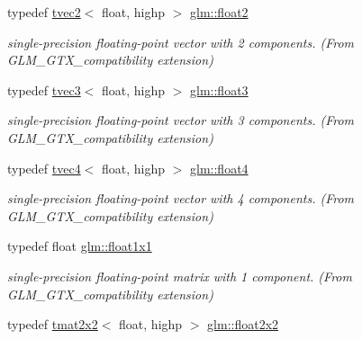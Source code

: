 \begin{DoxyCompactItemize}
typedef \hyperlink{structglm_1_1tvec2}{tvec2}$<$ float, highp $>$ \hyperlink{group__gtx__compatibility_ga3174e387d3b89c5dcff485c4e665a68c}{glm\+::float2}
\begin{DoxyCompactList}\small\item\em single-\/precision floating-\/point vector with 2 components. (From G\+L\+M\+\_\+\+G\+T\+X\+\_\+compatibility extension) \end{DoxyCompactList}\item 
\mbox{\label{group__gtx__compatibility_ga25f20d2c12f9b5f3917467e92899ea5a}} 
typedef \hyperlink{structglm_1_1tvec3}{tvec3}$<$ float, highp $>$ \hyperlink{group__gtx__compatibility_ga25f20d2c12f9b5f3917467e92899ea5a}{glm\+::float3}
\begin{DoxyCompactList}\small\item\em single-\/precision floating-\/point vector with 3 components. (From G\+L\+M\+\_\+\+G\+T\+X\+\_\+compatibility extension) \end{DoxyCompactList}\item 
\mbox{\label{group__gtx__compatibility_ga05e1940d91deb4bbe819881bf65dc52d}} 
typedef \hyperlink{structglm_1_1tvec4}{tvec4}$<$ float, highp $>$ \hyperlink{group__gtx__compatibility_ga05e1940d91deb4bbe819881bf65dc52d}{glm\+::float4}
\begin{DoxyCompactList}\small\item\em single-\/precision floating-\/point vector with 4 components. (From G\+L\+M\+\_\+\+G\+T\+X\+\_\+compatibility extension) \end{DoxyCompactList}\item 
\mbox{\label{group__gtx__compatibility_gaac1faa940ac1fbb32d4a315005b578af}} 
typedef float \hyperlink{group__gtx__compatibility_gaac1faa940ac1fbb32d4a315005b578af}{glm\+::float1x1}
\begin{DoxyCompactList}\small\item\em single-\/precision floating-\/point matrix with 1 component. (From G\+L\+M\+\_\+\+G\+T\+X\+\_\+compatibility extension) \end{DoxyCompactList}\item 
\mbox{\label{group__gtx__compatibility_ga577dc885086d068647175794909bc026}} 
typedef \hyperlink{structglm_1_1tmat2x2}{tmat2x2}$<$ float, highp $>$ \hyperlink{group__gtx__compatibility_ga577dc885086d068647175794909bc026}{glm\+::float2x2}

\end{DoxyCompactItemize}
